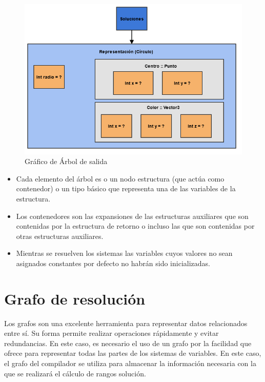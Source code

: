 \begin{figure}[h]
	\begin{center}
		\includegraphics[scale=0.55]{imagenes/salida.png}
	\end{center}
	\caption{
		\label{fig:estructura_salida}
		Gráfico de Árbol de salida
	}
\end{figure}

\begin{itemize}
 \item {Cada elemento del árbol es o un nodo estructura (que actúa como 
  contenedor) o un tipo básico que representa una de las variables de la 
  estructura.}
 \item {Los contenedores son las expansiones de las estructuras auxiliares que 
  son contenidas por la estructura de retorno o incluso las que son contenidas 
  por otras estructuras auxiliares.}
 \item {Mientras se resuelven los sistemas las variables cuyos valores no sean 
  asignados constantes por defecto no habrán sido inicializadas.}
\end{itemize}


\section{Grafo de resolución}
Los grafos son una excelente herramienta para representar datos relacionados 
entre sí. Su forma permite realizar operaciones rápidamente y evitar
redundancias. En este caso, es necesario el uso de un grafo por la facilidad que 
ofrece para representar todas las partes de los sistemas de variables. En este
caso, el grafo del compilador se utiliza para almacenar la información necesaria con
la que se realizará el cálculo de rangos solución.

